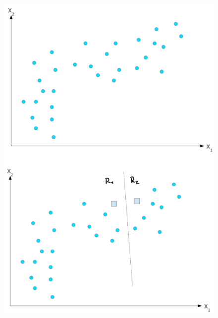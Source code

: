 \documentclass[12pt]{report} %
\begin{document}
\begin{figure}[H]
  {\includegraphics[scale=.2]{2021-03-26 09_37_22-Aprendizaje basado en instancias y no supervisados.pdf - Foxit Reader.png}
  \includegraphics[scale=.2]{2021-03-26 09_38_09-Aprendizaje basado en instancias y no supervisados.pdf - Foxit Reader.png}}
\end{figure}
\end{document}

